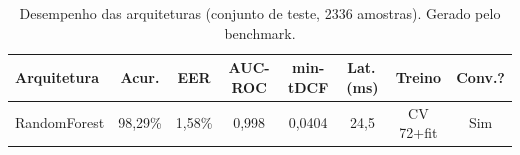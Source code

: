 \begin{table}[H]
\centering
\caption{Desempenho das arquiteturas (conjunto de teste, 2336 amostras). Gerado pelo benchmark.}
\label{tab:bench_resultados}
\small\singlespacing
\begin{tabular}{lccccccc}
\toprule
\textbf{Arquitetura} & \textbf{Acur.} & \textbf{EER} & \textbf{AUC-ROC} & \textbf{min-tDCF} & \textbf{Lat.\,(ms)} & \textbf{Treino} & \textbf{Conv.?} \\
\midrule
RandomForest & 98,29\% & 1,58\% & 0,998 & 0,0404 & 24,5 & CV 72+fit & \textcolor{successgreen}{Sim} \\
\bottomrule
\end{tabular}
\end{table}
